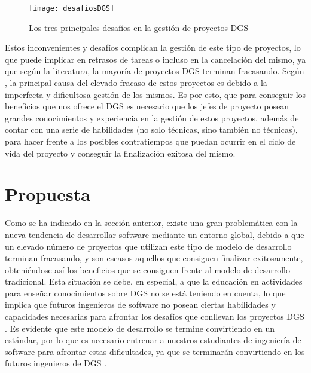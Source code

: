 \begin{figure}[htb]
	\centering
	\texttt{[image: desafiosDGS]}
	\caption[Desafíos en los proyectos DGS]{Los tres principales desafíos en la gestión de proyectos DGS}
	\label{fig:desafiosDGS}
\end{figure}

Estos inconvenientes y desafíos complican la gestión de este tipo de proyectos, lo que puede implicar en retrasos de tareas o incluso en la cancelación del mismo, ya que según la literatura, la mayoría de proyectos DGS terminan fracasando. Según \cite{lino2015project}, la principal causa del elevado fracaso de estos proyectos es debido a la imperfecta y dificultosa gestión de los mismos. Es por esto, que para conseguir los beneficios que nos ofrece el DGS es necesario que los jefes de proyecto posean grandes conocimientos y experiencia en la gestión de estos proyectos, además de contar con una serie de habilidades (no solo técnicas, sino también no técnicas), para hacer frente a los posibles contratiempos que puedan ocurrir en el ciclo de vida del proyecto y conseguir la finalización exitosa del mismo.


\section{Propuesta}
\label{sec:Propuesta}

Como se ha indicado en la sección anterior, existe una gran problemática con la nueva tendencia de desarrollar software mediante un entorno global, debido a que un elevado número de proyectos que utilizan este tipo de modelo de desarrollo terminan fracasando, y son escasos aquellos que consiguen finalizar exitosamente, obteniéndose así los beneficios que se consiguen frente al modelo de desarrollo tradicional. Esta situación se debe, en especial, a que la educación en actividades para enseñar conocimientos sobre DGS no se está teniendo en cuenta, lo que implica que futuros ingenieros de software no posean ciertas habilidades y capacidades necesarias para afrontar los desafíos que conllevan los proyectos DGS \cite{monasor2010preparing}. Es evidente que este modelo de desarrollo se termine convirtiendo en un estándar, por lo que es necesario entrenar a nuestros estudiantes de ingeniería de software para afrontar estas dificultades, ya que se terminarán convirtiendo en los futuros ingenieros de DGS \cite{beecham2017best}.

